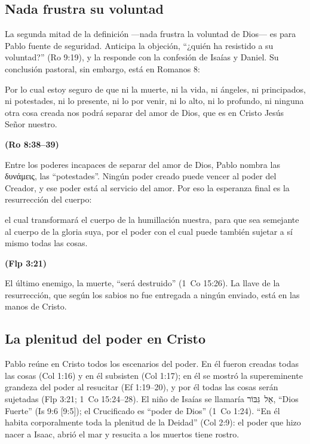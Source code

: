 \documentclass[11pt,letterpaper]{article}
\newcommand{\heb}[1]{\mbox{\foreignlanguage{hebrew}{#1}}}
\newcommand{\grc}[1]{\foreignlanguage{ancientgreek}{#1}}
\newcommand{\fuente}[1]{\par\hfill{\upshape\bfseries\small\textcolor{azul}{#1}}}
\begin{document}
\subsection{Nada frustra su voluntad}

La segunda mitad de la definición ---nada frustra la voluntad de Dios--- es para Pablo fuente de seguridad. Anticipa la objeción, ``¿quién ha resistido a su voluntad?'' (Ro 9:19), y la responde con la confesión de Isaías y Daniel. Su conclusión pastoral, sin embargo, está en Romanos 8:

\begin{cita}Por lo cual estoy seguro de que ni la muerte, ni la vida, ni ángeles, ni principados, ni potestades, ni lo presente, ni lo por venir, ni lo alto, ni lo profundo, ni ninguna otra cosa creada nos podrá separar del amor de Dios, que es en Cristo Jesús Señor nuestro.\fuente{(Ro 8:38--39)}\end{cita}

Entre los poderes incapaces de separar del amor de Dios, Pablo nombra las \grc{δυνάμεις}, las ``potestades''. Ningún poder creado puede vencer al poder del Creador, y ese poder está al servicio del amor. Por eso la esperanza final es la resurrección del cuerpo:

\begin{cita}el cual transformará el cuerpo de la humillación nuestra, para que sea semejante al cuerpo de la gloria suya, por el poder con el cual puede también sujetar a sí mismo todas las cosas.\fuente{(Flp 3:21)}\end{cita}

El último enemigo, la muerte, ``será destruido'' (1~Co 15:26). La llave de la resurrección, que según los sabios no fue entregada a ningún enviado, está en las manos de Cristo.

\subsection{La plenitud del poder en Cristo}

Pablo reúne en Cristo todos los escenarios del poder. En él fueron creadas todas las cosas (Col 1:16) y en él subsisten (Col 1:17); en él se mostró la supereminente grandeza del poder al resucitar (Ef 1:19--20), y por él todas las cosas serán sujetadas (Flp 3:21; 1~Co 15:24--28). El niño de Isaías se llamaría \heb{אֵל גִּבּוֹר}, ``Dios Fuerte'' (Is 9:6 [9:5]); el Crucificado es ``poder de Dios'' (1~Co 1:24). ``En él habita corporalmente toda la plenitud de la Deidad'' (Col 2:9): el poder que hizo nacer a Isaac, abrió el mar y resucita a los muertos tiene rostro.
\end{document}
